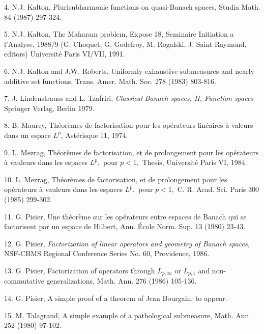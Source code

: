 \item{4.} N.J.  Kalton, Plurisubharmonic functions on quasi-Banach
spaces, Studia Math. 84 (1987) 297-324.
 
\item{5.} N.J.  Kalton, The Maharam problem, Expose 18, Seminaire
Initiation a l'Analyse, 1988/9 (G.  Choquet, G. Godefroy, M. Rogalski,
J. Saint Raymond, editors) Universit\'e Paris VI/VII, 1991.
 
\item{6.} N.J.  Kalton and J.W.  Roberts, Uniformly exhaustive
submeasures and nearly additive set functions, Trans.  Amer.  Math.
Soc. 278 (1983) 803-816.
 
\item{7.} J. Lindenstrauss and L. Tzafriri, {\it Classical Banach
spaces, II, Function spaces } Springer Verlag, Berlin 1979.
 
\item{8.} B. Maurey, Th\'eor\`emes de factorisation pour les op\'erateurs
lin\'eaires \`a valeurs dans un espace $L^p$, Ast\'erisque 11, 1974.
 
\item{9.} L. Mezrag, Th\'eor\`emes de factorisation, et de prolongement
pour les op\'erateurs \`a vauleurs dans les espaces $L^p,$ pour $p<1,$
Thesis, Universit\'e Paris VI, 1984.
 
\item{10.} L. Mezrag, Th\'eor\`emes de factorisation, et de prolongement
pour les op\'erateurs \`a vauleurs dans les espaces $L^p,$ pour $p<1,$
C. R. Acad. Sci. Paris 300 (1985) 299-302.
 
 
\item{11.} G. Pisier, Une th\'eor\`eme sur les op\'erateurs entre espaces
de Banach qui se factorisent par un espace de Hilbert, Ann. \'Ecole Norm.
Sup. 13 (1980) 23-43.
 
\item{12.} G. Pisier, {\it Factorization of linear operators and geometry
of
Banach spaces,} NSF-CBMS Regional Conference Series No. 60, Providence,
1986.
 
\item{13.} G. Pisier, Factorization of operators through $L_{p,\infty}$
or $L_{p,1}$ and non-commutative generalizations, Math.  Ann. 276 (1986)
105-136.
 
\item{14.} G. Pisier, A simple proof of a theorem of Jean Bourgain, to
appear.
 
 
\item{15.} M. Talagrand, A simple example of a pathological submeasure,
Math.  Ann. 252 (1980) 97-102.
 
